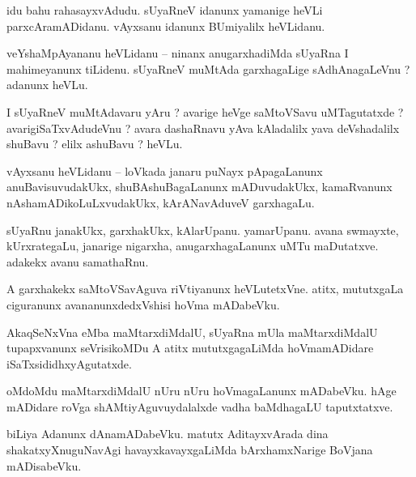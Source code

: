 \documentclass{article}
\begin{document}
\begin{mng}%
idu bahu rahasayxvAdudu. sUyaRneV idanunx yamanige heVLi parxcAramADidanu. vAyxsanu idanunx 
BUmiyalilx heVLidanu.
\end{mng}

 
\begin{mng}%
veYshaMpAyananu heVLidanu -- ninanx anugarxhadiMda sUyaRna I mahimeyanunx tiLidenu. sUyaRneV 
muMtAda garxhagaLige sAdhAnagaLeVnu ? adanunx heVLu.
\end{mng}

\begin{mng}%
I sUyaRneV muMtAdavaru yAru ? avarige heVge saMtoVSavu uMTagutatxde ? avarigiSaTxvAdudeVnu ? avara 
dashaRnavu yAva kAladalilx yava deVshadalilx shuBavu ? elilx ashuBavu ? heVLu.
\end{mng}

\begin{mng}%
vAyxsanu heVLidanu -- loVkada janaru puNayx pApagaLanunx anuBavisuvudakUkx, shuBAshuBagaLanunx 
mADuvudakUkx, kamaRvanunx nAshamADikoLuLxvudakUkx, kArANavAduveV garxhagaLu.
\end{mng}

\begin{mng}%
sUyaRnu janakUkx, garxhakUkx, kAlarUpanu. yamarUpanu. avana swmayxte, kUrxrategaLu, janarige 
nigarxha, anugarxhagaLanunx uMTu maDutatxve. adakekx avanu samathaRnu.
\end{mng}

\begin{mng}%
A garxhakekx saMtoVSavAguva riVtiyanunx heVLutetxVne. atitx, mututxgaLa ciguranunx 
avananunxdedxVshisi hoVma mADabeVku.
\end{mng}

\begin{mng}%
AkaqSeNxVna eMba maMtarxdiMdalU, sUyaRna mUla maMtarxdiMdalU tupapxvanunx seVrisikoMDu A atitx 
mututxgagaLiMda hoVmamADidare iSaTxsididhxyAgutatxde.
\end{mng}

\begin{mng}%
oMdoMdu maMtarxdiMdalU nUru nUru hoVmagaLanunx mADabeVku. hAge mADidare roVga 
shAMtiyAguvuydalalxde vadha baMdhagaLU taputxtatxve.
\end{mng}

\begin{mng}%
biLiya Adanunx dAnamADabeVku. matutx AditayxvArada dina shakatxyXnuguNavAgi havayxkavayxgaLiMda 
bArxhamxNarige BoVjana mADisabeVku.
\end{mng}
\end{document}
